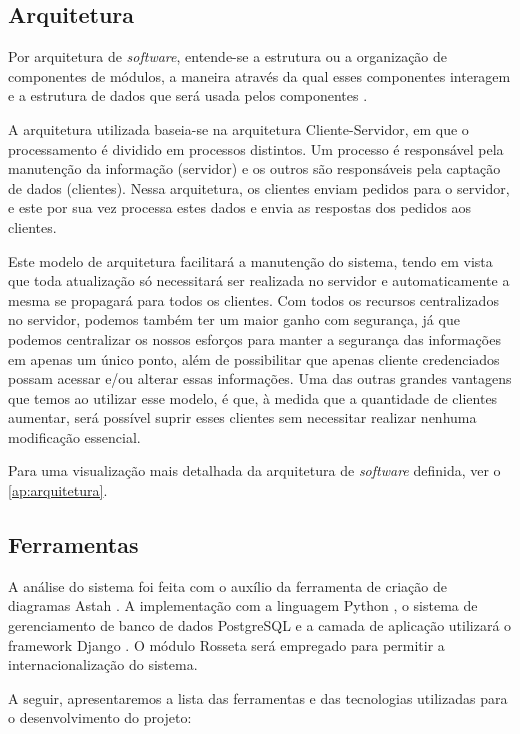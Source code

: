 \subsection{Arquitetura}
Por arquitetura de \textit{software}, entende-se a estrutura ou a organização de componentes de módulos, a maneira através da qual esses componentes interagem e a estrutura de dados que será usada pelos componentes \cite{pressman2006engenharia}.

A arquitetura utilizada baseia-se na arquitetura Cliente-Servidor\cite{david2013everything}, em que o processamento é dividido em processos distintos. Um processo é responsável pela manutenção da 
informação (servidor) e os outros são responsáveis pela captação de dados (clientes). Nessa arquitetura, os clientes enviam pedidos para o servidor, e este por sua vez processa estes dados e envia as 
respostas dos pedidos aos clientes.

Este modelo de arquitetura facilitará a manutenção do sistema, tendo em vista que toda atualização só necessitará ser realizada no servidor e automaticamente a mesma se propagará para todos os 
clientes. Com todos os recursos centralizados no servidor, podemos também ter um maior ganho com segurança, já que podemos centralizar os nossos esforços para manter a segurança das informações em 
apenas um único ponto, além de possibilitar que apenas cliente credenciados possam acessar e/ou alterar essas informações. Uma das outras grandes vantagens que temos  ao utilizar esse modelo, é que, 
\`a medida que a quantidade de clientes aumentar, será possível suprir esses clientes sem necessitar realizar nenhuma modificação essencial.

Para uma visualização mais detalhada da arquitetura de \textit{software} definida, ver o  \autoref{ap:arquitetura}.

\subsection{Ferramentas}

A análise do sistema foi feita com o auxílio da ferramenta de criação de diagramas Astah \cite{astah2016}. A implementação com a linguagem 
Python \cite{vanrossum2010python}, o sistema de gerenciamento de banco de dados PostgreSQL \cite{momjian2001postgresql} e a camada de 
aplicação utilizar\'a o framework Django \cite{django2016}. O módulo Rosseta \cite{rosetta2016} ser\'a empregado 
para permitir a internacionalização do sistema.
 
A seguir, apresentaremos a lista das ferramentas e das tecnologias utilizadas para o desenvolvimento do projeto:

